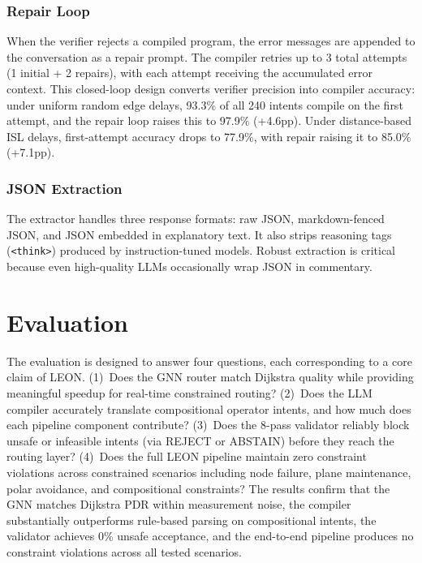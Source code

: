 \documentclass[10pt, conference, letterpaper]{IEEEtran}
\newcommand{\decision}[1]{\textsf{\MakeUppercase{#1}}}
\begin{document}
\subsubsection{Repair Loop}
When the verifier rejects a compiled program, the error messages are
appended to the conversation as a repair prompt. The compiler retries
up to 3 total attempts (1 initial + 2 repairs), with each attempt receiving the accumulated error
context. This closed-loop design converts verifier precision into
compiler accuracy: under uniform random edge delays, 93.3\% of all
240 intents compile on the first attempt, and the repair loop raises
this to 97.9\% (+4.6pp). Under distance-based ISL delays, first-attempt
accuracy drops to 77.9\%, with repair raising it to 85.0\% (+7.1pp).

\subsubsection{JSON Extraction}
The extractor handles three response formats: raw JSON, markdown-fenced
JSON, and JSON embedded in explanatory text. It also strips reasoning
tags (\texttt{<think>}) produced by instruction-tuned models. Robust
extraction is critical because even high-quality LLMs occasionally
wrap JSON in commentary.







\section{Evaluation}
\label{sec:eval}

The evaluation is designed to answer four questions, each corresponding
to a core claim of LEON. (1)~Does the GNN router match Dijkstra
quality while providing meaningful speedup for real-time constrained
routing? (2)~Does the LLM compiler accurately translate compositional
operator intents, and how much does each pipeline component
contribute? (3)~Does the 8-pass validator reliably block unsafe or
infeasible intents (via \decision{Reject} or \decision{Abstain})
before they reach the routing layer? (4)~Does the
full LEON pipeline maintain zero constraint violations across
constrained scenarios including node failure, plane maintenance,
polar avoidance, and compositional constraints?
The results confirm that the GNN matches Dijkstra PDR within
measurement noise, the compiler substantially outperforms rule-based
parsing on compositional intents, the validator achieves 0\% unsafe
acceptance, and the end-to-end pipeline produces no constraint
violations across all tested scenarios.
\end{document}
